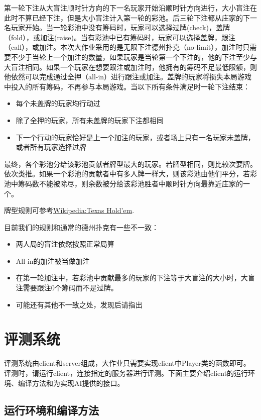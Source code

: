 \documentclass[11pt, fleqn, a4paper]{article}
\begin{document}
第一轮下注从大盲注顺时针方向的下一名玩家开始沿顺时针方向进行，大小盲注在此时不算已经下注，但是大小盲注计入第一轮的彩池。后三轮下注都从庄家的下一名玩家开始。当一轮彩池中没有筹码时，玩家可以选择过牌(check)，盖牌（fold），或加注(raise)。当有彩池中已有筹码时，玩家可以选择盖牌，跟注（call），或加注。本次大作业采用的是无限下注德州扑克（no-limit），加注时只需要不少于当轮上一个加注的数量，如果玩家是当轮第一个下注的，他的下注至少与大盲注相同。如果一个玩家在想要跟注或加注时，他拥有的筹码不足最低限额，则他依然可以完成通过全押（all-in）进行跟注或加注。盖牌的玩家将损失本局游戏中投入的所有筹码，不再参与本局游戏。当以下所有条件满足时一轮下注结束：
\begin{itemize}
	\item 每个未盖牌的玩家均行动过
	\item 除了全押的玩家，所有未盖牌的玩家下注都相同
	\item 下一个行动的玩家恰好是上一个加注的玩家，或者场上只有一名玩家未盖牌，或者所有玩家选择过牌
\end{itemize}

最终，各个彩池分给该彩池贡献者牌型最大的玩家。若牌型相同，则比较次要牌。依次类推。如果一个彩池的贡献者中有多人牌一样大，则该彩池由他们平分，若彩池中筹码数不能被除尽，则余数被分给该彩池胜者中顺时针方向最靠近庄家的一个。

牌型规则可参考\href{http://zh.wikipedia.org/zh-cn/%E5%BE%B7%E5%B7%9E%E6%92%B2%E5%85%8B#.E7.89.8C.E5.9E.8B.E5.A4.A7.E5.B0.8F.E8.A7.84.E5.88.99}{Wikipedia:Texas Hold'em}.

目前我们的规则和通常的德州扑克有一些不一致：
\begin{itemize}
	\item 两人局的盲注依然按照正常局算
	\item All-in的加注被当做加注
	\item 在第一轮加注中，若彩池中贡献最多的玩家的下注等于大盲注的大小时，大盲注需要跟注0个筹码而不是过牌。
	\item 可能还有其他不一致之处，发现后请指出
\end{itemize}

\section{评测系统}
\label{sec:test}

评测系统由client和server组成，大作业只需要实现client中Player类的函数即可。评测时，请运行client，连接指定的服务器进行评测。下面主要介绍client的运行环境、编译方法和为实现AI提供的接口。

\subsection{运行环境和编译方法}
\end{document}
